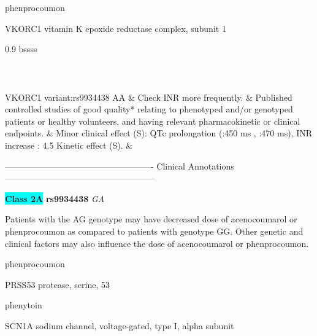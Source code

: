 \documentclass{resume} %
\begin{document}
\begin{rSection}{ phenprocoumon }
\begin{rSubsection}{ VKORC1 }{ vitamin K epoxide reductase complex, subunit 1 }{}{}
\begin{center}
\begin{tabularx}{0.9\textwidth}{ bssss }
\\
		\vspace{1pt}\\
		\hline \\
		\vspace{1pt}\\
		         VKORC1 variant:rs9934438 AA & Check INR more frequently. & Published controlled studies of good quality* relating to phenotyped and/or genotyped patients or healthy volunteers, and having relevant pharmacokinetic or clinical endpoints. & Minor clinical effect (S): QTc prolongation (:450 ms , :470 ms),  INR increase : 4.5 Kinetic effect (S). &
\\
		\end{tabularx}
		\end{center}
		\normalsize
		\vspace{10pt}
		        
\item[] ---------------------------------------------------- Clinical Annotations -----------------------------------------------------\newline
\item \textbf{\colorbox{cyan} {Class 2A}} \textbf{ rs9934438 } \textit{ GA }
\item[] Patients with the AG genotype may have decreased dose of acenocoumarol or phenprocoumon as compared to patients with genotype GG. Other genetic and clinical factors may also influence the dose of acenocoumarol or phenprocoumon.

\end{rSubsection}

\end{rSection}\begin{rSection}{ phenprocoumon }
\item[]
\begin{rSubsection}{ PRSS53 }{ protease, serine, 53 }{}{}
\item[]


\end{rSubsection}

\end{rSection}\begin{rSection}{ phenytoin }
\item[]
\begin{rSubsection}{ SCN1A }{ sodium channel, voltage-gated, type I, alpha subunit }{}{}
\item[]


\end{rSubsection}


\end{rSection}
\end{document}
